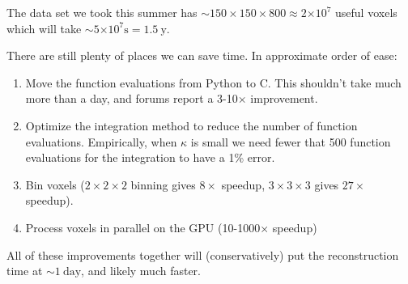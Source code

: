 \documentclass[11pt]{article}
\providecommand{\e}[1]{\ensuremath{\times 10^{#1}}}
\begin{document}
The data set we took this summer has $\sim 150\times 150\times 800 \approx 2\e{7}$
useful voxels which will take $\sim5\e{7} \text{s} = 1.5\ \text{y}$.

There are still plenty of places we can save time. In approximate order of ease:
\begin{enumerate}
\item Move the function evaluations from Python to C. This shouldn't take much
  more than a day, and forums report a 3-10$\times$ improvement.
\item Optimize the integration method to reduce the number of function
  evaluations. Empirically, when $\kappa$ is small we need fewer that 500
  function evaluations for the integration to have a 1\% error.
\item Bin voxels ($2\times2\times2$ binning gives $8\times$ speedup,
  $3\times3\times3$ gives $27\times$ speedup).
\item Process voxels in parallel on the GPU (10-1000$\times$ speedup)
\end{enumerate}

All of these improvements together will (conservatively) put the reconstruction time at $\sim 1\ \text{day}$, and likely much faster.
{}

\end{document}
